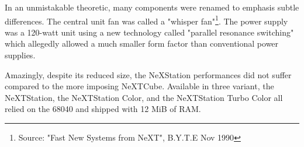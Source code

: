 \par
{}
\par
In an unmistakable theoretic, many components were renamed to emphasis subtle differences. The central unit fan was called a "whisper fan"\footnote{Source: "Fast New Systems from NeXT", B.Y.T.E Nov 1990}.  The power supply was a 120-watt unit using a new technology called "parallel resonance switching" which allegedly allowed a much smaller form factor than conventional power supplies.\\
\par
Amazingly, despite its reduced size, the NeXStation performances did not suffer compared to the more imposing NeXTCube. Available in three variant, the NeXTStation, the NeXTStation Color, and the NeXTStation Turbo Color all relied on the 68040 and shipped with 12 MiB of RAM.\\
\par
{}
\pagebreak









